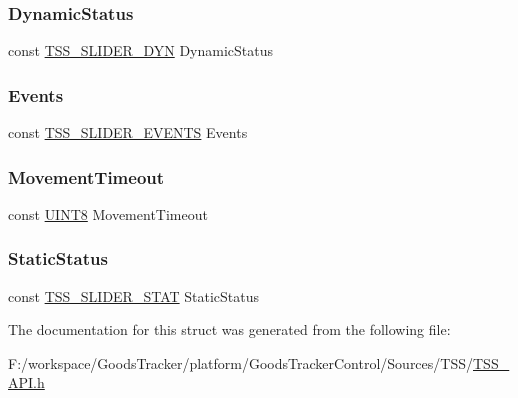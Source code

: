 \subsubsection{\texorpdfstring{Dynamic\+Status}{DynamicStatus}}
{\footnotesize\ttfamily const \hyperlink{struct_t_s_s___s_l_i_d_e_r___d_y_n}{T\+S\+S\+\_\+\+S\+L\+I\+D\+E\+R\+\_\+\+D\+YN} Dynamic\+Status}

\mbox{\label{struct_t_s_s___c_s_slider_a6a67c9e8b9b2a0934ae230baff75b66b}} 
\subsubsection{\texorpdfstring{Events}{Events}}
{\footnotesize\ttfamily const \hyperlink{struct_t_s_s___s_l_i_d_e_r___e_v_e_n_t_s}{T\+S\+S\+\_\+\+S\+L\+I\+D\+E\+R\+\_\+\+E\+V\+E\+N\+TS} Events}

\mbox{\label{struct_t_s_s___c_s_slider_ad3e98b5d97454837cd6293b7abffbe9f}} 
\subsubsection{\texorpdfstring{Movement\+Timeout}{MovementTimeout}}
{\footnotesize\ttfamily const \hyperlink{_t_s_s___data_types_8h_ab27e9918b538ce9d8ca692479b375b6a}{U\+I\+N\+T8} Movement\+Timeout}

\mbox{\label{struct_t_s_s___c_s_slider_a095e6eb920491a2526b8678a3d6f7124}} 
\subsubsection{\texorpdfstring{Static\+Status}{StaticStatus}}
{\footnotesize\ttfamily const \hyperlink{struct_t_s_s___s_l_i_d_e_r___s_t_a_t}{T\+S\+S\+\_\+\+S\+L\+I\+D\+E\+R\+\_\+\+S\+T\+AT} Static\+Status}



The documentation for this struct was generated from the following file\+:\begin{DoxyCompactItemize}
\item 
F\+:/workspace/\+Goods\+Tracker/platform/\+Goods\+Tracker\+Control/\+Sources/\+T\+S\+S/\hyperlink{_t_s_s___a_p_i_8h}{T\+S\+S\+\_\+\+A\+P\+I.\+h}\end{DoxyCompactItemize}
